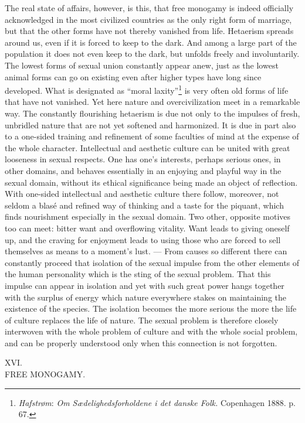 \documentclass[12pt,a4paper,openany]{book}
\newcommand{\opage}[1]{\marginnote{\footnotesize\textit{[#1]}}}
\newcounter{etikch}
\newcommand{\chapterhead}[2]{\stepcounter{etikch}\bigskip\begin{center}\pdfbookmark[1]{#1 #2}{etikch.\arabic{etikch}}#1\\[3pt]{\large #2}\end{center}\medskip}
\begin{document}
The real state of affairs, however, is this, that free monogamy is indeed officially acknowledged in the most civilized
countries as the only right form of marriage, but that the other forms have not thereby vanished from life. Hetaerism
spreads around us, even if it is forced to keep to the dark. And among a large part of the population it does not even
keep to the dark, but unfolds freely and involuntarily. The lowest forms of sexual union constantly appear anew, just as
the lowest animal forms can go on existing even after higher types have long since developed. What is designated as
``moral laxity''\footnote[1]{\emph{Hafstrøm}: \textit{Om Sædelighedsforholdene i det danske Folk.} Copenhagen 1888.
p. 67.} is very often old forms of life that have not vanished. Yet here nature and overcivilization meet in a
remarkable way. The constantly flourishing hetaerism is due not only to the impulses of fresh, unbridled nature that are
not yet softened and harmonized. It is due in part also to a one-sided training and refinement of some faculties of
mind at the expense of the whole character. Intellectual and aesthetic culture can be united with great looseness in
sexual respects. One has one's interests, perhaps serious ones, in other domains, and behaves essentially in an
enjoying and playful way in the sexual domain, without its ethical significance being made an object of reflection.
With one-sided intellectual and aesthetic culture there follow, moreover, not seldom a blasé and refined way of thinking
and a taste for the piquant, which finds nourishment especially in the sexual domain. Two other, opposite motives too
can meet: bitter want and overflowing vitality.
\opage{286}Want leads to giving oneself up, and the craving for enjoyment leads to using those who are forced to sell
themselves as means to a moment's lust. --- From causes so different there can constantly proceed that isolation of the
sexual impulse from the other elements of the human personality which is the sting of the sexual problem. That this
impulse can appear in isolation and yet with such great power hangs together with the surplus of energy which nature
everywhere stakes on maintaining the existence of the species. The isolation becomes the more serious the more the life
of culture replaces the life of nature. The sexual problem is therefore closely interwoven with the whole problem of
culture and with the whole social problem, and can be properly understood only when this connection is not forgotten.

\chapterhead{XVI.}{FREE MONOGAMY.}
\end{document}

